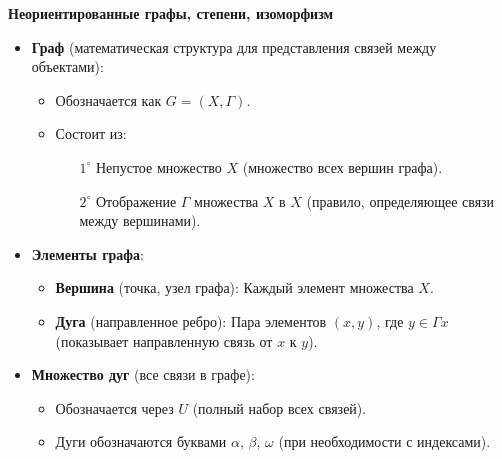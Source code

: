\textbf{Неориентированные графы, степени, изоморфизм}

\begin{itemize}

\item \textbf{Граф} (математическая структура для представления связей между объектами):

\begin{itemize}

\item Обозначается как $G = (X, \Gamma)$.

\item Состоит из:

\begin{enumerate}

\item[\(1^\circ\)] Непустое множество $X$ (множество всех вершин графа).

\item[\(2^\circ\)] Отображение $\Gamma$ множества $X$ в $X$ (правило, определяющее связи между вершинами).

\end{enumerate}

\end{itemize}

\item \textbf{Элементы графа}:

\begin{itemize}

\item \textbf{Вершина} (точка, узел графа): Каждый элемент множества $X$.

\item \textbf{Дуга} (направленное ребро): Пара элементов $(x, y)$, где $y \in \Gamma x$ (показывает направленную связь от $x$ к $y$).

\end{itemize}

\item \textbf{Множество дуг} (все связи в графе):

\begin{itemize}

\item Обозначается через $U$ (полный набор всех связей).

\item Дуги обозначаются буквами $\alpha$, $\beta$, $\omega$ (при необходимости с индексами).

\end{itemize}

\end{itemize}

